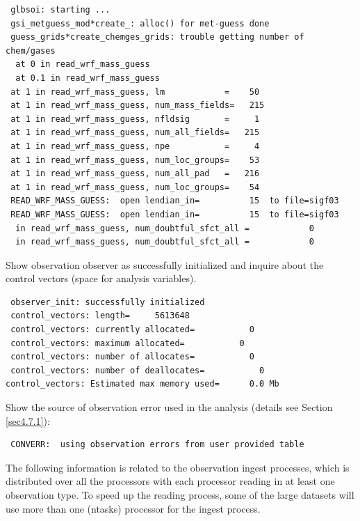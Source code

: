 \begin{scriptsize}
\begin{verbatim}
 glbsoi: starting ...
 gsi_metguess_mod*create_: alloc() for met-guess done
 guess_grids*create_chemges_grids: trouble getting number of chem/gases
  at 0 in read_wrf_mass_guess
  at 0.1 in read_wrf_mass_guess
 at 1 in read_wrf_mass_guess, lm            =    50
 at 1 in read_wrf_mass_guess, num_mass_fields=   215
 at 1 in read_wrf_mass_guess, nfldsig       =     1
 at 1 in read_wrf_mass_guess, num_all_fields=   215
 at 1 in read_wrf_mass_guess, npe           =     4
 at 1 in read_wrf_mass_guess, num_loc_groups=    53
 at 1 in read_wrf_mass_guess, num_all_pad   =   216
 at 1 in read_wrf_mass_guess, num_loc_groups=    54
 READ_WRF_MASS_GUESS:  open lendian_in=          15  to file=sigf03
 READ_WRF_MASS_GUESS:  open lendian_in=          15  to file=sigf03
  in read_wrf_mass_guess, num_doubtful_sfct_all =            0
  in read_wrf_mass_guess, num_doubtful_sfct_all =            0

\end{verbatim}
\end{scriptsize}

Show observation observer as successfully initialized and inquire about the control vectors (space for analysis variables).

\begin{scriptsize}
\begin{verbatim}
 observer_init: successfully initialized
 control_vectors: length=     5613648
 control_vectors: currently allocated=           0
 control_vectors: maximum allocated=           0
 control_vectors: number of allocates=           0
 control_vectors: number of deallocates=           0
control_vectors: Estimated max memory used=      0.0 Mb
\end{verbatim}
\end{scriptsize}
Show the source of observation error used in the analysis (details see Section \ref{sec4.7.1}):
\begin{scriptsize}
\begin{verbatim}
 CONVERR:  using observation errors from user provided table
\end{verbatim}
\end{scriptsize}

The following information is related to the observation ingest processes, which is distributed over all the processors with each processor reading in at least one observation type. To speed up the reading process, some of the large datasets will use more than one (ntasks) processor for the ingest process.

